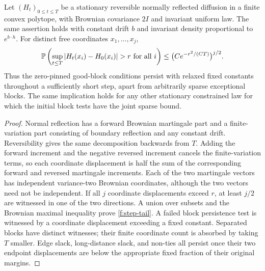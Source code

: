 \begin{lemma}\label{f:step}
Let $(H_t)_{0\le t\le T}$ be a stationary reversible normally reflected
diffusion in a finite convex polytope, with Brownian covariance $2I$ and
invariant uniform law. The same assertion holds with constant drift $b$
and invariant density proportional to $e^{b\cdot h}$.
For distinct free coordinates $x_1,\ldots,x_j$,
\begin{equation}\label{f:step-tail}
 \Prob\left(\sup_{t\le T}|H_t(x_i)-H_0(x_i)|>r
                  \text{ for all }i\right)
 \le\bigl(Ce^{-r^2/(CT)}\bigr)^{j/2}.
\end{equation}
Thus the zero-pinned good-block conditions persist with relaxed fixed
constants throughout a sufficiently short step, apart from arbitrarily
sparse exceptional blocks. The same implication holds for any other
stationary constrained law for which the initial block tests have the
joint sparse bound.
\end{lemma}
\begin{proof}
Normal reflection has a forward Brownian martingale part and a
finite-variation part consisting of boundary reflection and any constant
drift. Reversibility gives the same decomposition backwards
from $T$. Adding the forward increment and the negative reversed increment
cancels the finite-variation terms, so each coordinate displacement is half the
sum of the corresponding forward and reversed martingale increments.
Each of the two martingale vectors has independent variance-two Brownian
coordinates, although the two vectors need not be independent. If all $j$
coordinate displacements exceed $r$, at least $j/2$ are witnessed in one
of the two directions. A union over subsets and the Brownian maximal
inequality prove \eqref{f:step-tail}. A failed block persistence test is
witnessed by a coordinate displacement exceeding a fixed constant.
Separated blocks have distinct witnesses; their finite coordinate count
is absorbed by taking $T$ smaller. Edge slack, long-distance slack, and
non-ties all persist once their two endpoint displacements are below
the appropriate fixed fraction of their original margins.
\end{proof}

